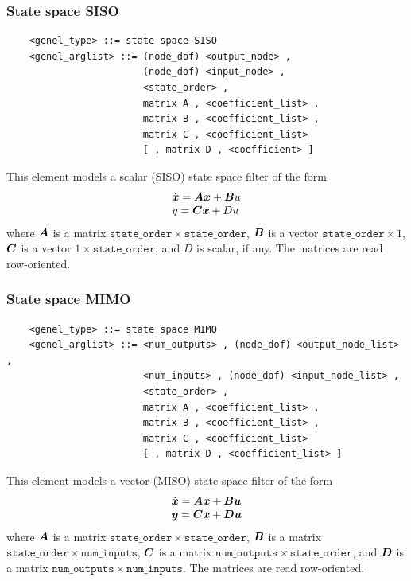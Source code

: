 \subsubsection{State space SISO}
\begin{verbatim}
    <genel_type> ::= state space SISO
    <genel_arglist> ::= (node_dof) <output_node> ,
                        (node_dof) <input_node> ,
                        <state_order> ,
                        matrix A , <coefficient_list> ,
                        matrix B , <coefficient_list> ,
                        matrix C , <coefficient_list>
                        [ , matrix D , <coefficient> ]
\end{verbatim}
This element models a scalar (SISO) state space filter of the form
\begin{displaymath}
    \begin{array}{l}  
        \dot{\boldsymbol{x}} = \boldsymbol{A}\boldsymbol{x}+\boldsymbol{B}u \\
	y = \boldsymbol{C}\boldsymbol{x}+Du
     \end{array}
\end{displaymath}
where
$ \boldsymbol{A} $ is a matrix $ \mathtt{state\_order} \times \mathtt{state\_order} $,
$ \boldsymbol{B} $ is a vector $ \mathtt{state\_order} \times 1 $,
$ \boldsymbol{C} $ is a vector $1 \times \mathtt{state\_order} $,
and $ D $ is scalar, if any.
The matrices are read row-oriented.

\subsubsection{State space MIMO}
\begin{verbatim}
    <genel_type> ::= state space MIMO
    <genel_arglist> ::= <num_outputs> , (node_dof) <output_node_list> ,
                        <num_inputs> , (node_dof) <input_node_list> ,
                        <state_order> ,
                        matrix A , <coefficient_list> ,
                        matrix B , <coefficient_list> ,
                        matrix C , <coefficient_list>
                        [ , matrix D , <coefficient_list> ]
\end{verbatim}
This element models a vector (MISO) state space filter of the form
\begin{displaymath}
    \begin{array}{l}  
        \dot{\boldsymbol{x}} = \boldsymbol{A}\boldsymbol{x}+\boldsymbol{B}\boldsymbol{u} \\
	\boldsymbol{y} = \boldsymbol{C}\boldsymbol{x}+\boldsymbol{D}\boldsymbol{u}
     \end{array}
\end{displaymath}
where
$ \boldsymbol{A} $ is a matrix $ \mathtt{state\_order} \times \mathtt{state\_order} $,
$ \boldsymbol{B} $ is a matrix $ \mathtt{state\_order} \times \mathtt{num\_inputs} $,
$ \boldsymbol{C} $ is a matrix $ \mathtt{num\_outputs} \times \mathtt{state\_order} $,
and
$ \boldsymbol{D} $ is a matrix $ \mathtt{num\_outputs} \times \mathtt{num\_inputs} $.
The matrices are read row-oriented.


